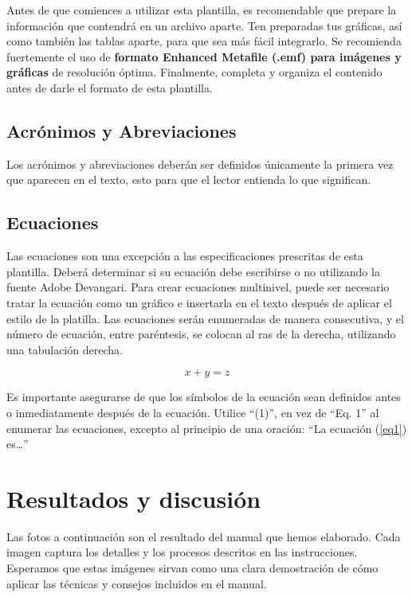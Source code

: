     Antes de que comiences a utilizar esta plantilla, es recomendable que prepare la información que contendrá en un archivo aparte. 
    Ten preparadas tus gráficas, así como también las tablas aparte, para que sea más fácil integrarlo. 
    Se recomienda fuertemente el uso de \textbf{formato Enhanced Metafile (.emf) para imágenes y gráficas} de resolución óptima. 
    Finalmente, completa y organiza el contenido antes de darle el formato de esta plantilla. 
    
    \subsection{Acrónimos y Abreviaciones}
    
    Los acrónimos y abreviaciones deberán ser definidos únicamente la primera vez que aparecen en el texto, esto para que el lector entienda lo que significan.
    
    \subsection{Ecuaciones}
    
    Las ecuaciones son una excepción a las especificaciones prescritas de esta plantilla. 
    Deberá determinar si su ecuación debe escribirse o no utilizando la fuente Adobe Devangari. 
    Para crear ecuaciones multinivel, puede ser necesario tratar la ecuación como un gráfico e insertarla en el texto después de aplicar el estilo de la platilla.
    Las ecuaciones serán enumeradas de manera consecutiva, y el número de ecuación, entre paréntesis, se colocan al ras de la derecha, utilizando una tabulación derecha. 
    
    \begin{equation}
        \label{eq1}
        x + y = z 
    \end{equation}
    
    Es importante asegurarse de que los símbolos de la ecuación sean definidos antes o inmediatamente después de la ecuación. Utilice “(1)”, en vez de “Eq. 1” al enumerar las ecuaciones, excepto al principio de una oración: “La ecuación (\ref{eq1}) es…”
    
    \section{Resultados y discusión}
    
    Las fotos a continuación son el resultado del manual que hemos elaborado. Cada imagen captura los detalles y los procesos descritos en las instrucciones. Esperamos que estas imágenes sirvan como una clara demostración de cómo aplicar las técnicas y consejos incluidos en el manual. 
    

